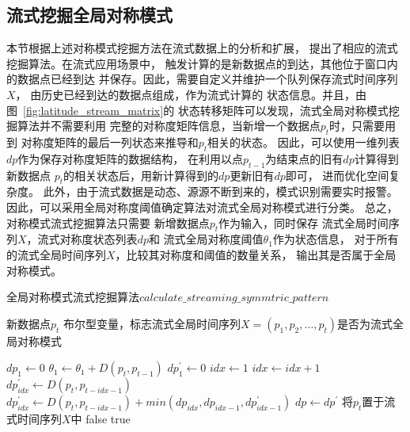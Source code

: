 \subsection{流式挖掘全局对称模式}
本节根据上述对称模式挖掘方法在流式数据上的分析和扩展，
提出了相应的流式挖掘算法。在流式应用场景中，
触发计算的是新数据点的到达，其他位于窗口内的数据点已经到达
并保存。因此，需要自定义并维护一个队列保存流式时间序列$X$，
由历史已经到达的数据点组成，作为流式计算的
状态信息。并且，由图~\ref{fig:latitude_stream_matrix}的
状态转移矩阵可以发现，流式全局对称模式挖掘算法并不需要利用
完整的对称度矩阵信息，当新增一个数据点$p_t$时，只需要用到
对称度矩阵的最后一列状态来推导和$p_t$相关的状态。
因此，可以使用一维列表$dp$作为保存对称度矩阵的数据结构，
在利用以点$p_{t-1}$为结束点的旧有$dp$计算得到新数据点
$p_t$的相关状态后，用新计算得到的$dp$更新旧有$dp$即可，
进而优化空间复杂度。
此外，由于流式数据是动态、源源不断到来的，模式识别需要实时报警。
因此，可以采用全局对称度阈值确定算法对流式全局对称模式进行分类。
总之，对称模式流式挖掘算法只需要
新增数据点$p_t$作为输入，同时保存
流式全局时间序列$X$，流式对称度状态列表$dp$和
流式全局对称度阈值$\theta_1$作为状态信息，
对于所有的流式全局时间序列$X$，比较其对称度和阈值的数量关系，
输出其是否属于全局对称模式。

\renewcommand{\algorithmicrequire}{\textbf{输入：}\unskip}
\renewcommand{\algorithmicensure}{\textbf{输出：}\unskip}

\begin{algorithm}
  \caption{全局对称模式流式挖掘算法$calculate\_streaming\_symmtric\_pattern$}
  \label{alg:streaming_symmetric_pattern}
  \small
  \begin{algorithmic}
    \REQUIRE 新数据点$p_t$
    \ENSURE 布尔型变量，标志流式全局时间序列$X=\left(p_{1},p_{2},\dots,p_t \right)$是否为流式全局对称模式

      \STATE $dp_{1} \leftarrow 0$
    \ELSE
      \STATE $\theta_1 \leftarrow \theta_1+D\left(p_{t}, p_{t-1}\right)$
      \STATE $dp_1^{\prime} \leftarrow 0$
      \STATE $ idx \leftarrow 1$
        \STATE $ idx \leftarrow idx+1$
          \STATE $dp_{idx}^{\prime} \leftarrow D\left(p_{t}, p_{t-idx-1}\right)$
        \ELSE
          \STATE $dp_{idx}^{\prime} \leftarrow D\left(p_{t}, p_{t-idx-1}\right)+min(dp_{idx},dp_{idx-1},dp_{idx-1}^{\prime})$
        \ENDIF
      \ENDWHILE
      \STATE $ dp \leftarrow dp^{\prime}$
    \ENDIF
    \STATE 将$p_t$置于流式时间序列$X$中
      \RETURN false
    \ELSE
      \RETURN true
    \ENDIF
  \end{algorithmic}
\end{algorithm}

